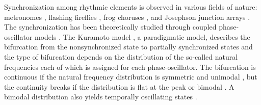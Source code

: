 

Synchronization among rhythmic elements is observed in various fields of nature:
metronomes \cite{pantaleone2002},
flashing fireflies \cite{smith1935,buck1968},
frog choruses \cite{aihara2014},
and Josephson junction arrays \cite{wiesenfeld1996,wiesenfeld1998}.
The synchronization has been theoretically studied
through coupled phase-oscillator models \cite{winfree1967,kuramoto1975}.
The Kuramoto model \cite{kuramoto1975}, a paradigmatic model,
describes the bifurcation from the nonsynchronized state
to partially synchronized states
and the type of bifurcation depends on the distribution of
the so-called natural frequencies each of which is assigned
for each phase-oscillator.
The bifurcation is continuous
if the natural frequency distribution is symmetric and unimodal
\cite{kuramoto1975,strogatz2000,chiba2015},
but the continuity breaks if the distribution is
flat at the peak \cite{basnarkov-urumov-07,bastian-18}
or bimodal \cite{martens2009}.
A bimodal distribution also yields temporally oscillating states
\cite{martens2009}.

